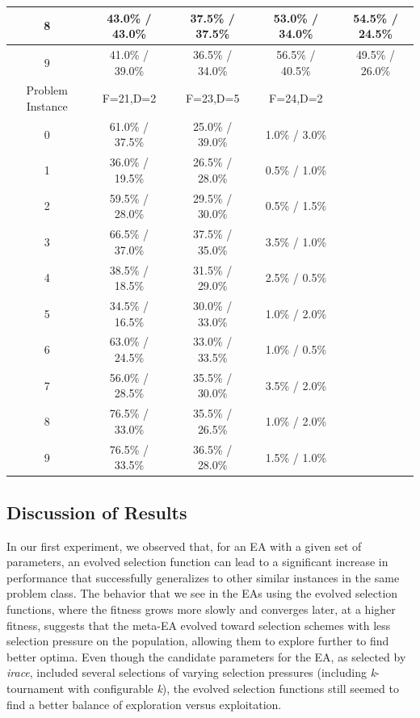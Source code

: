 \documentclass[sigconf]{acmart}
\begin{document}
\begin{table}
\begin{tabular}{c|c|c|c|c}
		\hline
		8 & 43.0\% / 43.0\% & 37.5\% / 37.5\% & 53.0\% / 34.0\% & 54.5\% / 24.5\%\\
		\hline
		9 & 41.0\% / 39.0\% & 36.5\% / 34.0\% & 56.5\% / 40.5\% & 49.5\% / 26.0\%\\
		\hline
		\hline
		Problem Instance & F=21,D=2 & F=23,D=5 & F=24,D=2\\
		\hline
		0 & 61.0\% / 37.5\% & 25.0\% / 39.0\% & 1.0\% / 3.0\%& \\
		\hline
		1 & 36.0\% / 19.5\% & 26.5\% / 28.0\% & 0.5\% / 1.0\%& \\
		\hline
		2 & 59.5\% / 28.0\% & 29.5\% / 30.0\% & 0.5\% / 1.5\%& \\
		\hline
		3 & 66.5\% / 37.0\% & 37.5\% / 35.0\% & 3.5\% / 1.0\%& \\
		\hline
		4 & 38.5\% / 18.5\% & 31.5\% / 29.0\% & 2.5\% / 0.5\%& \\
		\hline
		5 & 34.5\% / 16.5\% & 30.0\% / 33.0\% & 1.0\% / 2.0\%& \\
		\hline
		6 & 63.0\% / 24.5\% & 33.0\% / 33.5\% & 1.0\% / 0.5\%& \\
		\hline
		7 & 56.0\% / 28.5\% & 35.5\% / 30.0\% & 3.5\% / 2.0\%& \\
		\hline
		8 & 76.5\% / 33.0\% & 35.5\% / 26.5\% & 1.0\% / 2.0\%& \\
		\hline
		9 & 76.5\% / 33.5\% & 36.5\% / 28.0\% & 1.5\% / 1.0\%& \\
		
		\bottomrule
	\end{tabular}
\end{table}

\subsection{Discussion of Results}
\label{resultsDiscussion}

In our first experiment, we observed that, for an EA with a given set of parameters, an evolved selection function can lead to a significant increase in performance that successfully generalizes to other similar instances in the same problem class. The behavior that we see in the EAs using the evolved selection functions, where the fitness grows more slowly and converges later, at a higher fitness, suggests that the meta-EA evolved toward selection schemes with less selection pressure on the population, allowing them to explore further to find better optima. Even though the candidate parameters for the EA, as selected by \textit{irace}, included several selections of varying selection pressures (including \textit{k}-tournament with configurable \textit{k}), the evolved selection functions still seemed to find a better balance of exploration versus exploitation.
\end{document}
